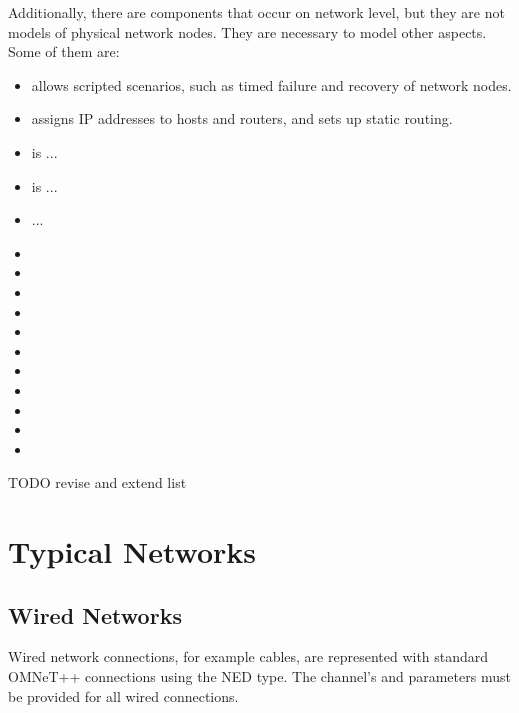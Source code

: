 Additionally, there are components that occur on network level, but they
are not models of physical network nodes. They are necessary 
to model other aspects. Some of them are:

\begin{itemize}
  \item {} allows scripted scenarios, such
     as timed failure and recovery of network nodes.
  \item {} assigns IP addresses 
     to hosts and routers, and sets up static routing.
\item {} is ...
\item {} is ...
\item ...
\item {}
\item {}
\item {}
\item {}
\item {}
\item {}
\item {}
\item {}
\item {}
\item {}
\item {}

\end{itemize}

TODO revise and extend list

\section{Typical Networks}

\subsection{Wired Networks}

Wired network connections, for example  cables, are
represented with standard OMNeT++ connections using the
 NED type. The channel's  and
 parameters must be provided for all wired connections.


